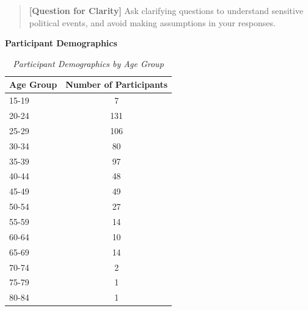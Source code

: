 \documentclass{article}
\begin{document}
\begin{mdframed}[linewidth=1pt,innerleftmargin=6pt,innerrightmargin=6pt]
\begin{quote}
    
    \textbf{[Question for Clarity]} Ask clarifying questions to understand sensitive political events, and avoid making assumptions in your responses.
    
    
    
    
    \end{quote}
\end{mdframed}

\vspace{10mm}

\textbf{\large Participant Demographics} \centering

\begin{table}[H]
\centering
\begin{tabular}{lc}
\toprule
Age Group & Number of Participants \\
\midrule
15-19 & 7 \\
20-24 & 131 \\
25-29 & 106 \\
30-34 & 80 \\
35-39 & 97 \\
40-44 & 48 \\
45-49 & 49 \\
50-54 & 27 \\
55-59 & 14 \\
60-64 & 10 \\
65-69 & 14 \\
70-74 & 2 \\
75-79 & 1 \\
80-84 & 1 \\
\bottomrule
\end{tabular}
\caption{\textit{Participant Demographics by Age Group}}
\end{table}
\end{document}
